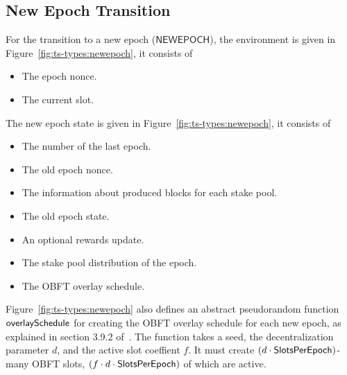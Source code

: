 \clearpage

\subsection{New Epoch Transition}
\label{sec:new-epoch-trans}

For the transition to a new epoch ($\mathsf{NEWEPOCH}$), the environment is
given in Figure~\ref{fig:ts-types:newepoch}, it consists of

\begin{itemize}
\item The epoch nonce.
\item The current slot.
\end{itemize}
The new epoch state is given in Figure~\ref{fig:ts-types:newepoch}, it consists
of

\begin{itemize}
\item The number of the last epoch.
\item The old epoch nonce.
\item The information about produced blocks for each stake pool.
\item The old epoch state.
\item An optional rewards update.
\item The stake pool distribution of the epoch.
\item The OBFT overlay schedule.
\end{itemize}

Figure~\ref{fig:ts-types:newepoch} also defines an abstract pseudorandom function
$\mathsf{overlaySchedule}$ for creating the OBFT overlay schedule for each new epoch,
as explained in section 3.9.2 of~\cite{delegation_design}.
The function takes a seed, the decentralization parameter $d$, and the active slot coeffient $f$.
It must create $(d\cdot\mathsf{SlotsPerEpoch})$-many OBFT slots, $(f\cdot d\cdot \mathsf{SlotsPerEpoch})$
of which are active.

